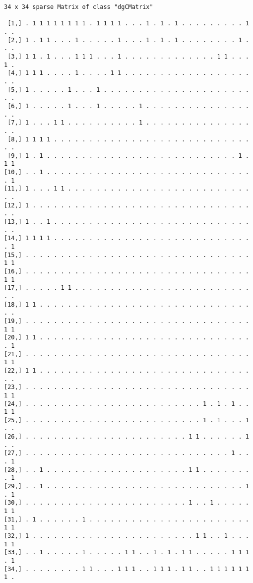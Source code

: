 \documentclass[
  letterpaper,
  DIV=11,
  numbers=noendperiod,
  oneside]{scrreprt}
\begin{document}
\begin{verbatim}
34 x 34 sparse Matrix of class "dgCMatrix"
                                                                         
 [1,] . 1 1 1 1 1 1 1 1 . 1 1 1 1 . . . 1 . 1 . 1 . . . . . . . . . 1 . .
 [2,] 1 . 1 1 . . . 1 . . . . . 1 . . . 1 . 1 . 1 . . . . . . . . 1 . . .
 [3,] 1 1 . 1 . . . 1 1 1 . . . 1 . . . . . . . . . . . . . 1 1 . . . 1 .
 [4,] 1 1 1 . . . . 1 . . . . 1 1 . . . . . . . . . . . . . . . . . . . .
 [5,] 1 . . . . . 1 . . . 1 . . . . . . . . . . . . . . . . . . . . . . .
 [6,] 1 . . . . . 1 . . . 1 . . . . . 1 . . . . . . . . . . . . . . . . .
 [7,] 1 . . . 1 1 . . . . . . . . . . 1 . . . . . . . . . . . . . . . . .
 [8,] 1 1 1 1 . . . . . . . . . . . . . . . . . . . . . . . . . . . . . .
 [9,] 1 . 1 . . . . . . . . . . . . . . . . . . . . . . . . . . . 1 . 1 1
[10,] . . 1 . . . . . . . . . . . . . . . . . . . . . . . . . . . . . . 1
[11,] 1 . . . 1 1 . . . . . . . . . . . . . . . . . . . . . . . . . . . .
[12,] 1 . . . . . . . . . . . . . . . . . . . . . . . . . . . . . . . . .
[13,] 1 . . 1 . . . . . . . . . . . . . . . . . . . . . . . . . . . . . .
[14,] 1 1 1 1 . . . . . . . . . . . . . . . . . . . . . . . . . . . . . 1
[15,] . . . . . . . . . . . . . . . . . . . . . . . . . . . . . . . . 1 1
[16,] . . . . . . . . . . . . . . . . . . . . . . . . . . . . . . . . 1 1
[17,] . . . . . 1 1 . . . . . . . . . . . . . . . . . . . . . . . . . . .
[18,] 1 1 . . . . . . . . . . . . . . . . . . . . . . . . . . . . . . . .
[19,] . . . . . . . . . . . . . . . . . . . . . . . . . . . . . . . . 1 1
[20,] 1 1 . . . . . . . . . . . . . . . . . . . . . . . . . . . . . . . 1
[21,] . . . . . . . . . . . . . . . . . . . . . . . . . . . . . . . . 1 1
[22,] 1 1 . . . . . . . . . . . . . . . . . . . . . . . . . . . . . . . .
[23,] . . . . . . . . . . . . . . . . . . . . . . . . . . . . . . . . 1 1
[24,] . . . . . . . . . . . . . . . . . . . . . . . . . 1 . 1 . 1 . . 1 1
[25,] . . . . . . . . . . . . . . . . . . . . . . . . . 1 . 1 . . . 1 . .
[26,] . . . . . . . . . . . . . . . . . . . . . . . 1 1 . . . . . . 1 . .
[27,] . . . . . . . . . . . . . . . . . . . . . . . . . . . . . 1 . . . 1
[28,] . . 1 . . . . . . . . . . . . . . . . . . . . 1 1 . . . . . . . . 1
[29,] . . 1 . . . . . . . . . . . . . . . . . . . . . . . . . . . . 1 . 1
[30,] . . . . . . . . . . . . . . . . . . . . . . . 1 . . 1 . . . . . 1 1
[31,] . 1 . . . . . . 1 . . . . . . . . . . . . . . . . . . . . . . . 1 1
[32,] 1 . . . . . . . . . . . . . . . . . . . . . . . 1 1 . . 1 . . . 1 1
[33,] . . 1 . . . . . 1 . . . . . 1 1 . . 1 . 1 . 1 1 . . . . . 1 1 1 . 1
[34,] . . . . . . . . 1 1 . . . 1 1 1 . . 1 1 1 . 1 1 . . 1 1 1 1 1 1 1 .
\end{verbatim}
\end{document}
